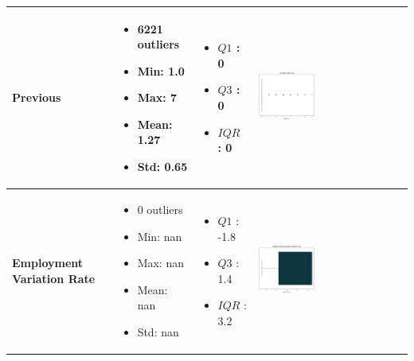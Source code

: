 \documentclass{article}
\begin{document}
\begin{longtable}{|p{}|p{}|p{}|p{}|}
            \hline
            \textbf{Previous} & 
            \begin{itemize}
                \item 6221 outliers
                \item Min: 1.0
                \item Max: 7
                \item Mean: 1.27
                \item Std: 0.65
            \end{itemize} & 
            \begin{itemize}
                \item $Q1$ : 0
                \item $Q3$ : 0
                \item $IQR$ : 0
            \end{itemize} &
            \includegraphics[width=0.40\textwidth]{data/bank_marketing/pic/Outlier/Previous_Add.png} \\
            \hline
            \textbf{Employment Variation Rate} & 
            \begin{itemize}
                \item 0 outliers
                \item Min: nan
                \item Max: nan
                \item Mean: nan
                \item Std: nan
            \end{itemize} & 
            \begin{itemize}
                \item $Q1$ : -1.8
                \item $Q3$ : 1.4
                \item $IQR$ : 3.2
            \end{itemize} &
            \includegraphics[width=0.40\textwidth]{data/bank_marketing/pic/Outlier/Emp.png} \\

\end{longtable}
\end{document}
